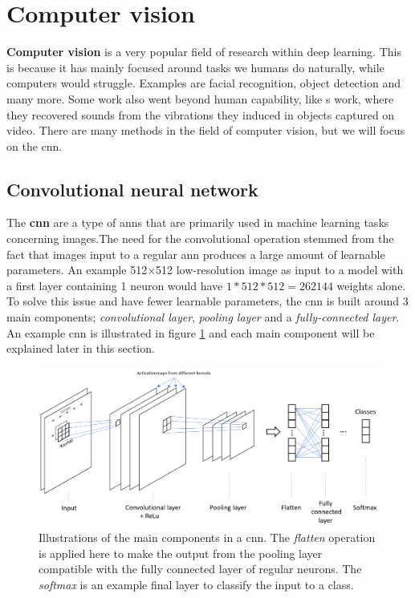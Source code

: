 \section{Computer vision} \label{computer vision}
    \textbf{Computer vision} is a very popular field of research within deep learning\cite{voulodimos2018deep_computer_vision}. This is because it has mainly focused around tasks we humans do naturally, while computers would struggle. Examples are facial recognition, object detection and many more. Some work also went beyond human capability, like \citeauthor{davis2014visual_deep_video_audio}s\cite{davis2014visual_deep_video_audio} work, where they recovered sounds from the vibrations they induced in objects captured on video. There are many methods in the field of computer vision, but we will focus on the \gls{cnn}.
    
    
    
\subsection{Convolutional neural network} \label{cnn}
    The \textbf{\gls{cnn}} are a type of \gls{ann}s that are primarily used in machine learning tasks concerning images\cite{o2015introduction_convolutions}.The need for the convolutional operation stemmed from the fact that images input to a regular \gls{ann} produces a large amount of learnable parameters. An example 512×512 low-resolution image as input to a model with a first layer containing 1 neuron would have $1*512*512 = 262144$ weights alone.  To solve this issue and have fewer learnable parameters, the \gls{cnn} is built around 3 main components\cite{o2015introduction_convolutions}; \textit{convolutional layer}, \textit{pooling layer} and a \textit{fully-connected layer}. An example \gls{cnn} is illustrated in figure \ref{convolutional_neural_network_fig} and each main component will be explained later in this section.

    \begin{figure}[H]
        \centering
        \includegraphics[scale=0.4]{figures/conv_net.png}
        \caption[Convolutional neural network example]{Illustrations of the main components in a \gls{cnn}. The \textit{flatten} operation is applied here to make the output from the pooling layer compatible with the fully connected layer of regular neurons. The \textit{softmax} is an example final layer to classify the input to a class.}
      	\medskip 
        \label{convolutional_neural_network_fig}
    \end{figure}
    
